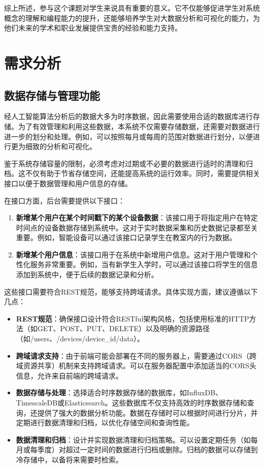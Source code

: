 \documentclass[oneside]{xduugthesis}
\begin{document}
综上所述，参与这个课题对学生来说具有重要的意义。它不仅能够促进学生对系统概念的理解和编程能力的提升，还能够培养学生对大数据分析和可视化的能力，为他们未来的学术和职业发展提供宝贵的经验和能力支持。


\let\cleardoublepage\clearpage
\chapter{需求分析}

\section{数据存储与管理功能}

经人工智能算法分析后的数据大多为时序数据，因此需要使用合适的数据库进行存储。为了有效管理和利用这些数据，本系统不仅需要存储数据，还需要对数据进行进一步的划分和处理。例如，可以按照每月或每周的范围对数据进行划分，以便进行更为细致的分析和可视化。

鉴于系统存储容量的限制，必须考虑对过期或不必要的数据进行适时的清理和归档。这不仅有助于节省存储空间，还能提高系统的运行效率。同时，需要提供相关接口以便于数据管理和用户信息的存储。

在接口方面，后台需要提供以下接口：

\begin{enumerate}[nosep]
    \item \textbf{新增某个用户在某个时间戳下的某个设备数据}：该接口用于将指定用户在特定时间点的设备数据存储到系统中。这对于实时数据采集和历史数据记录都至关重要。例如，智能设备可以通过该接口记录学生在教室内的行为数据。
    
    \item \textbf{新增某个用户信息}：该接口用于在系统中新增用户信息。这对于用户管理和个性化服务非常重要。例如，当有新学生入学时，可以通过该接口将学生的信息添加到系统中，便于后续的数据记录和分析。
\end{enumerate}

这些接口需要符合REST规范，能够支持跨域请求。具体实现方面，建议遵循以下几点：

\begin{itemize}[nosep]
    \item \textbf{REST规范}：确保接口设计符合RESTful架构风格，包括使用标准的HTTP方法（如GET、POST、PUT、DELETE）以及明确的资源路径（如/users、/devices/{device_id}/data）。
    
    \item \textbf{跨域请求支持}：由于前端可能会部署在不同的服务器上，需要通过CORS（跨域资源共享）机制来支持跨域请求。可以在服务器配置中添加适当的CORS头信息，允许来自前端的跨域请求。
    
    \item \textbf{数据存储与处理}：选择适合时序数据存储的数据库，如InfluxDB、TimescaleDB或Elasticsearch。这些数据库不仅支持高效的时序数据存储和查询，还提供了强大的数据分析功能。数据在存储时可以根据时间进行分片，并定期进行数据清理和归档，以优化存储空间和查询性能。
    
    \item \textbf{数据清理和归档}：设计并实现数据清理和归档策略。可以设置定期任务（如每月或每季度）对超过一定时间的数据进行归档或删除。归档的数据可以存储到冷存储中，以备将来需要时检索。
\end{itemize}
\end{document}

